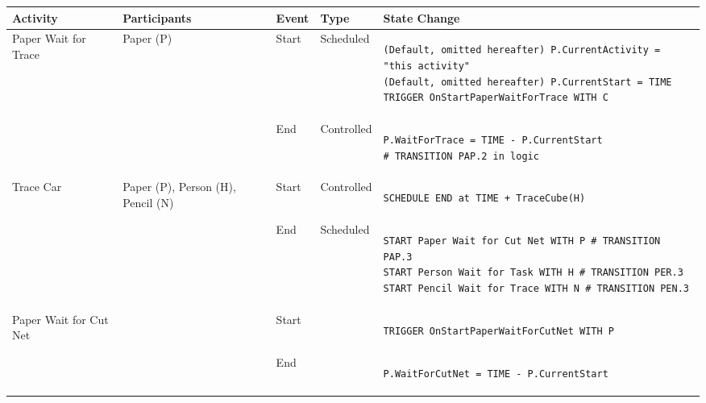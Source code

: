 \begin{longtable}{@{}>{\raggedright\arraybackslash}p{1.8cm}>{\raggedright\arraybackslash}p{2.1cm}>{\raggedright\arraybackslash}p{0.9cm}>{\raggedright\arraybackslash}p{2.2cm}>{\raggedright\arraybackslash}p{8.75cm}@{}}
  \toprule
  Activity                                   & Participants                                             & Event & Type       & State Change \\ \midrule
  \endhead
  Paper Wait for Trace      & Paper (P)                            & Start & Scheduled  & 
\begin{lstlisting}[language=CMPseudo]
(Default, omitted hereafter) P.CurrentActivity = "this activity"
(Default, omitted hereafter) P.CurrentStart = TIME
TRIGGER OnStartPaperWaitForTrace WITH C
\end{lstlisting}             \\
                                             &                                                          & End   & Controlled &
  \begin{lstlisting}[language=CMPseudo]
P.WaitForTrace = TIME - P.CurrentStart
# TRANSITION PAP.2 in logic
  \end{lstlisting}              \\ \midrule
  Trace Car                 & Paper (P), Person (H), Pencil (N)       & Start & Controlled &  
\begin{lstlisting}[language=CMPseudo]
SCHEDULE END at TIME + TraceCube(H)
\end{lstlisting}              \\
                                             &                                                          & End   & Scheduled  & 
\begin{lstlisting}[language=CMPseudo]
START Paper Wait for Cut Net WITH P # TRANSITION PAP.3
START Person Wait for Task WITH H # TRANSITION PER.3
START Pencil Wait for Trace WITH N # TRANSITION PEN.3
\end{lstlisting}              \\ \midrule
  Paper Wait for Cut Net    &                                & Start &   & 
\begin{lstlisting}[language=CMPseudo]
TRIGGER OnStartPaperWaitForCutNet WITH P
\end{lstlisting}              \\
  &                                                          & End   &  & 
\begin{lstlisting}[language=CMPseudo]
P.WaitForCutNet = TIME - P.CurrentStart

\end{lstlisting}
\end{longtable}

